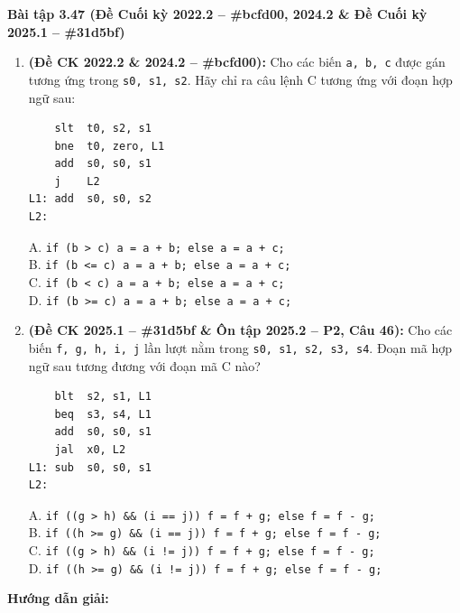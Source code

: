 \textbf{Bài tập 3.47 (Đề Cuối kỳ 2022.2 -- \#bcfd00, 2024.2 \& Đề Cuối kỳ 2025.1 -- \#31d5bf)}
\begin{enumerate}[label=\alph*)]
    \item \textbf{(Đề CK 2022.2 \& 2024.2 -- \#bcfd00):} Cho các biến \texttt{a, b, c} được gán tương ứng trong \texttt{s0, s1, s2}. Hãy chỉ ra câu lệnh C tương ứng với đoạn hợp ngữ sau:

\noindent\begin{minipage}{\linewidth}
\begin{lstlisting}
    slt  t0, s2, s1
    bne  t0, zero, L1
    add  s0, s0, s1
    j    L2
L1: add  s0, s0, s2
L2:
\end{lstlisting}
\end{minipage}

    A. \texttt{if (b > c) a = a + b; else a = a + c;}\\
    B. \texttt{if (b <= c) a = a + b; else a = a + c;}\\
    C. \texttt{if (b < c) a = a + b; else a = a + c;}\\
    D. \texttt{if (b >= c) a = a + b; else a = a + c;}
    \item \textbf{(Đề CK 2025.1 -- \#31d5bf \& Ôn tập 2025.2 -- P2, Câu 46):} Cho các biến \texttt{f, g, h, i, j} lần lượt nằm trong \texttt{s0, s1, s2, s3, s4}. Đoạn mã hợp ngữ sau tương đương với đoạn mã C nào?

\noindent\begin{minipage}{\linewidth}
\begin{lstlisting}
    blt  s2, s1, L1
    beq  s3, s4, L1
    add  s0, s0, s1
    jal  x0, L2
L1: sub  s0, s0, s1
L2:
\end{lstlisting}
\end{minipage}

    A. \texttt{if ((g > h) \&\& (i == j)) f = f + g; else f = f - g;}\\
    B. \texttt{if ((h >= g) \&\& (i == j)) f = f + g; else f = f - g;}\\
    C. \texttt{if ((g > h) \&\& (i != j)) f = f + g; else f = f - g;}\\
    D. \texttt{if ((h >= g) \&\& (i != j)) f = f + g; else f = f - g;}
\end{enumerate}
\textbf{Hướng dẫn giải:}
